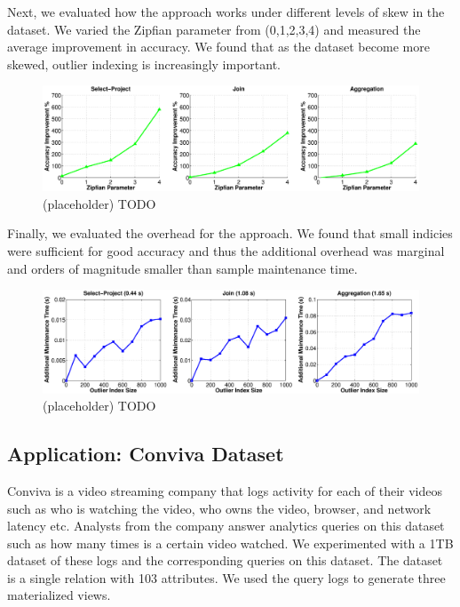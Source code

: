 Next, we evaluated how the approach works under different levels of skew in the dataset. We varied the Zipfian parameter from (0,1,2,3,4) and measured the average improvement in accuracy. 
We found that as the dataset become more skewed, outlier indexing is increasingly important.
\begin{figure}[ht!]
\label{exp8outlier}
\centering
\includegraphics[width=\textwidth]{exp/exp8-outlier.eps}
 \caption{(placeholder) TODO}
\end{figure}

Finally, we evaluated the overhead for the approach. 
We found that small indicies were sufficient for good accuracy and thus the additional overhead was marginal and orders of magnitude smaller than sample maintenance time.

\begin{figure}[ht!]
\label{exp9outlier}
\centering
\includegraphics[width=\textwidth]{exp/exp9-outlier.eps}
 \caption{(placeholder) TODO}
\end{figure}

\subsection{Application: Conviva Dataset}
Conviva is a video streaming company that logs activity for each of their videos such as who is watching the video, who owns the video, browser, and network latency etc. 
Analysts from the company answer analytics queries on this dataset such as how many times is a certain video watched.
We experimented with a 1TB dataset of these logs and the corresponding queries on this dataset.
The dataset is a single relation with 103 attributes.
We used the query logs to generate three materialized views.
\vspace{1em}

